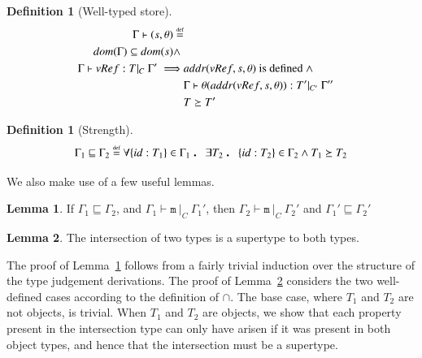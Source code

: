 \documentclass[12pt,a4paper,twoside,openright]{report}
\theoremstyle{definition}
\newtheorem{definition}[equation]{Definition}
\theoremstyle{dotless}
\newtheorem{lemma}[definition]{Lemma}
\newcommand\eqdef{\mathrel{\overset{\makebox[0pt]{\mbox{\normalfont\tiny def}}}{=}}}
\newcommand\qdot{\mathbin{\scalebox{1.5}{.}}\enspace}
\begin{document}
\begin{definition}[Well-typed store]
  \begin{equation} \label{eqn:typed-store}
  	\begin{split}
  	  \Gamma\vdash(s,\theta)\eqdef \\
  	  dom(\Gamma) \subseteq dom(s) \land\ & \\
  	  \Gamma \vdash vRef:T|_C\ \Gamma' \implies & addr(vRef,s, \theta)\textrm{ is defined}\ \land \\
  	  & \Gamma\vdash\theta(addr(vRef,s,\theta)):T'|_{C'}\ \Gamma'' \\
	  & T\succeq T'
  	\end{split}
  \end{equation}
\end{definition}
\begin{definition}[Strength]
  \begin{equation} \label{eqn:strength}
	\Gamma_1 \sqsubseteq \Gamma_2 \eqdef 
	\forall\{id:T_1\}\in\Gamma_1 \qdot \exists T_2 \qdot \{id:T_2\}\in\Gamma_2 \land T_1\succeq T_2
  \end{equation}
\end{definition}

We also make use of a few useful lemmas.
\begin{lemma}
  \label{lm:strChain}
  If $\Gamma_1 \sqsubseteq \Gamma_2$, and $\Gamma_1\vdash\mathtt{m}\ |_C\ \Gamma_1'$, 
  then $\Gamma_2\vdash\mathtt{m}\ |_C\ \Gamma_2'$ and
  $\Gamma_1'\sqsubseteq\Gamma_2'$ 
\end{lemma}
\begin{lemma}
  \label{lm:intersect}
  The intersection of two types is a supertype to both types. 
\end{lemma}

The proof of Lemma~\ref{lm:strChain} follows from a fairly trivial induction
over the structure of the type judgement derivations. The proof of
Lemma~\ref{lm:intersect} considers the two well-defined cases according to the
definition of $\cap$. The base case, where $T_1$ and $T_2$ are not objects, is
trivial. When $T_1$ and $T_2$ are objects, we show that each property present
in the intersection type can only have arisen if it was present in both object
types, and hence that the intersection must be a supertype.
\end{document}
